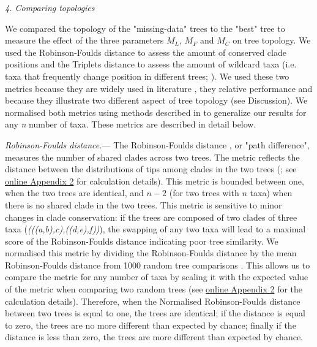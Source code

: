 \documentclass[12pt,letterpaper]{article}
\renewcommand{\subsection}[1]{%
\bigskip
\begin{center}
\begin{large}
\normalfont\itshape #1
\end{large}
\end{center}}
\renewcommand{\subsubsection}[1]{%
\vspace{2ex}
\noindent
\textit{#1.}---}
\begin{document}
\subsection{4. Comparing topologies}
We compared the topology of the "missing-data" trees to the "best" tree to measure the effect of the three parameters $M_{L}$, $M_{F}$ and $M_{C}$ on tree topology. We used the Robinson-Foulds distance \citep{RF1981} to assess the amount of conserved clade positions and the Triplets distance \citep{dobson1975triplets} to assess the amount of wildcard taxa (i.e. taxa that frequently change position in different trees; \citealt{kearneyfragmentary2002}).
We used these two metrics because they are widely used in literature \citep{Bogdanowicz2012}, they relative performance \citep{Kuhner04112014} and because they illustrate two different aspect of tree topology (see Discussion).
We normalised both metrics using methods described in \citet{Bogdanowicz2012} to generalize our results for any \textit{n} number of taxa. These metrics are described in detail below.

\subsubsection{Robinson-Foulds distance}
The Robinson-Foulds distance \citep{RF1981}, or "path difference", measures the number of shared clades across two trees. The metric reflects the distance between the distributions of tips among clades in the two trees (\citealt{RF1981}; see \hyperref[SupplementaryMaterial]{online Appendix 2} for calculation details). This metric is bounded between one, when the two trees are identical, and $n-2$ (for two trees with $n$ taxa) when there is no shared clade in the two trees. This metric is sensitive to minor changes in clade conservation: if the trees are composed of two clades of three taxa (\textit{(((a,b),c),((d,e),f))}), the swapping of any two taxa will lead to a maximal score of the Robinson-Foulds distance indicating poor tree similarity. We normalised this metric by dividing the Robinson-Foulds distance by the mean Robinson-Foulds distance from 1000 random tree comparisons \citep{Bogdanowicz2012}. This allows us to compare the metric for any number of taxa by scaling it with the expected value of the metric when comparing two random trees (see \hyperref[SupplementaryMaterial]{online Appendix 2} for the calculation details). Therefore, when the Normalised Robinson-Foulds distance between two trees is equal to one, the trees are identical; if the distance is equal to zero, the trees are no more different than expected by chance; finally if the distance is less than zero, the trees are more different than expected by chance.
\end{document}
